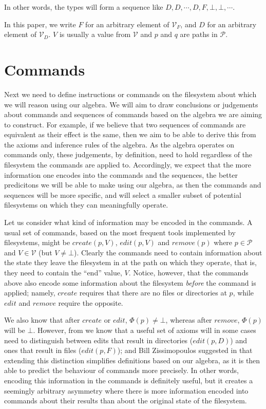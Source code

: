 \documentclass[12pt]{article}
\newcommand{\setv}{\mathcal{V}}
\newcommand{\setvx}[1]{\mathcal{V}_{#1}}
\newcommand{\setf}{\setvx{F}}
\newcommand{\setd}{\setvx{D}}
\newcommand{\setp}{\mathcal{P}}
\newcommand{\empt}{\bot}
\newcommand{\FS}{\Phi} %
\begin{document}


In other words, the types will form a sequence like $D,D,\cdots,D,F,\empt,\empt,\cdots$.

In this paper, we write $F$ for an arbitrary element of $\setf$, and $D$ for an arbitrary element
of $\setd$. $V$ is usually a value from $\setv$ and $p$ and $q$ are paths in $\setp$.

\section{Commands}

Next we need to define instructions or commands on the filesystem about which we will reason
using our algebra.
We will aim to draw conclusions or judgements about commands and sequences of commands
based on the algebra we are aiming to construct.
For example, if we believe that two sequences of commands are equivalent as their effect
is the same, then we aim to be able to derive this from the axioms and inference rules of the
algebra.
As the algebra operates on commands only,
these judgements, by definition, need to hold regardless of the filesystem the commands are applied to.
Accordingly, we expect that the more information one encodes into the commands and the sequences,
the better predicitons we will be able to make using our algebra,
as then the commands and sequences will be more specific, and will select a smaller subset
of potential filesystems on which they can meaningfully operate.

Let us consider what kind of information may be encoded in the commands.
A usual set of commands, based on the most frequent tools implemented by filesystems,
might be $create(p,V)$, $edit(p,V)$ and $remove(p)$ where $p\in\setp$ and $V\in\setv$ (but $V\neq\empt$).
Clearly the commands need to contain information about the state they leave the filesystem
in at the path on which they operate, that is, they need to contain the ``end'' value, $V$.
Notice, however, that the commands above also encode some information about the filesystem
{\it before} the command is applied; namely, $create$ requires that there are no files
or directories at $p$, while $edit$ and $remove$ require the opposite.

We also know that after $create$ or $edit$, $\FS(p)\neq\empt$, whereas after $remove$,
$\FS(p)$ will be $\empt$. However, from \cite{NREC:alg} we know that a useful set of axioms
will in some cases need to distinguish between edits that result in directories ($edit(p,D)$) and
ones that result in files ($edit(p,F)$);
and Bill Zissimopoulos suggested in \cite{BZ} that extending this distinction simplifies
definitions based on our algebra, as it is then able to predict the behaviour of commands
more precisely. 
In other words, encoding this information in the commands is definitely useful,
but it creates a seemingly arbitrary asymmetry where
there is more information encoded into commands about their results than about the
original state of the filesystem.
\end{document}
